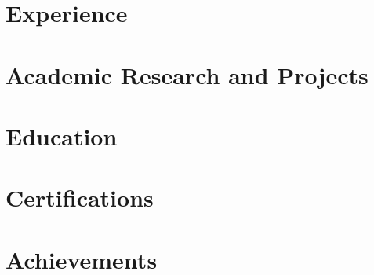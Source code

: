 \documentclass[letterpaper,11pt]{article}
\begin{document}
\setlength{\footskip}{4.08003pt}

% 





\section{Experience}
    \resumeSubHeadingListStart  
        
        
        
    \resumeSubHeadingListEnd

\section{Academic Research and Projects}
    \resumeSubHeadingListStart
        
        
    \resumeSubHeadingListEnd

\section{Education}
\resumeSubHeadingListStart
    
    
\resumeSubHeadingListEnd

\section{Certifications}
    \resumeSubHeadingListStart
        
        
        
                
    \resumeSubHeadingListEnd
    

\section{Achievements}
    \resumeSubHeadingListStart
        
        
    \resumeSubHeadingListEnd
\end{document}
